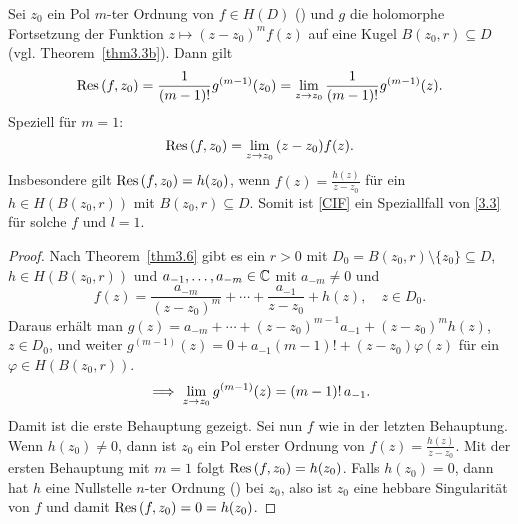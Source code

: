\documentclass[a4paper,twoside,DIV15,BCOR12mm]{scrbook}
\begin{document}
\begin{lem} \label{lem3.11}
  Sei $z_0$ ein Pol $m$-ter Ordnung von $f\in H(D)$ () und $g$ die holomorphe Fortsetzung der Funktion $z\mapsto(z-z_0)^m
  f(z)$ auf eine Kugel $B(z_0,r)\subseteq D$ (vgl. Theorem~\ref{thm3.3b}). Dann gilt
  \[ \mathrm{Res}\left(f,z_0\right) = \frac{1}{(m-1)!} g^{(m-1)}(z_0) = \lim_{z\to z_0}{\frac{1}{(m-1)!}g^{(m-1)}(z)}. \]
  Speziell für $m=1$:
  \[ \mathrm{Res}\left(f,z_0\right) = \lim_{z\to z_0}{(z-z_0)f(z)}. \]
  Insbesondere gilt $\mathrm{Res}\left(f,z_0\right) = h(z_0)$, wenn $f(z)=\frac{h(z)}{z-z_0}$ für ein $h\in H(B(z_0,r))$ mit $B(z_0,r)\subseteq
  D$. Somit ist \eqref{CIF} ein Speziallfall von \eqref{3.3} für solche $f$ und $l=1$.
\end{lem}
\begin{proof}
  Nach Theorem~\ref{thm3.6} gibt es ein $r>0$ mit $D_0=B(z_0,r)\setminus\{z_0\}\subseteq D$, $h\in H(B(z_0,r))$ und
  $a_{-1},\dotsc,a_{-m}\in\mathbb{C}$ mit $a_{-m}\neq0$ und
  \[ f(z) = \frac{a_{-m}}{(z-z_0)^m} + \dotsb + \frac{a_{-1}}{z-z_0} + h(z), \quad z \in D_0. \]
  Daraus erhält man $g(z) = a_{-m}+\dotsb+(z-z_0)^{m-1}a_{-1}+(z-z_0)^m h(z)$, $z\in D_0$, und weiter $g^{(m-1)}(z) = 0 +
  a_{-1}(m-1)! + (z-z_0)\varphi(z)$ für ein $\varphi\in H(B(z_0,r))$.
  \[ \implies \lim_{z\to z_0}{g^{(m-1)}(z)} = (m-1)!\,a_{-1}. \]
  Damit ist die erste Behauptung gezeigt. Sei nun $f$ wie in der letzten Behauptung. Wenn $h(z_0)\neq0$, dann ist $z_0$ ein Pol
  erster Ordnung von $f(z)=\frac{h(z)}{z-z_0}$. Mit der ersten Behauptung mit $m=1$ folgt $\mathrm{Res}\left(f,z_0\right)=h(z_0)$. Falls
  $h(z_0)=0$, dann hat $h$ eine Nullstelle $n$-ter Ordnung () bei $z_0$, also ist $z_0$ eine hebbare Singularität von $f$
  und damit $\mathrm{Res}\left(f,z_0\right)=0=h(z_0)$.
\end{proof}
\end{document}
